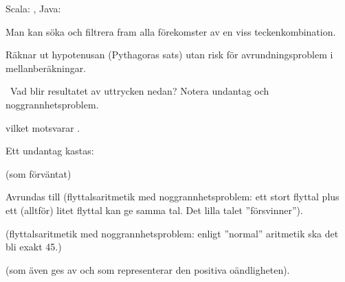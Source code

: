 \SubtaskSolved Scala: , Java: 

\SubtaskSolved Man kan söka och filtrera fram alla förekomster av en viss teckenkombination.

\SubtaskSolved Räknar ut hypotenusan (Pythagoras sats) utan risk för avrundningsproblem i mellanberäkningar.


\QUESTEND






\QUESTBEGIN

\Task \what~Vad blir resultatet av uttrycken nedan? Notera undantag  och noggrannhetsproblem.

\Subtask {}

\Subtask {}

\Subtask {}

\Subtask {}

\Subtask {}

\Subtask\Uberkurs {}

\Subtask\Uberkurs {}

\Subtask\Uberkurs {}

\Subtask\Uberkurs {}

\Subtask {}

\SOLUTION

\TaskSolved \what

\SubtaskSolved {} vilket motsvarar .

\SubtaskSolved Ett undantag kastas: 

\SubtaskSolved {} (som förväntat)

\SubtaskSolved Avrundas till  (flyttalsaritmetik med noggrannhetsproblem: ett stort flyttal plus ett (alltför) litet flyttal kan ge samma tal. Det lilla talet ''försvinner'').


\SubtaskSolved {} (flyttalsaritmetik med noggrannhetsproblem: enligt ''normal'' aritmetik ska det bli exakt 45.)

\SubtaskSolved {} (som även ges av  och som representerar den positiva oändligheten).

